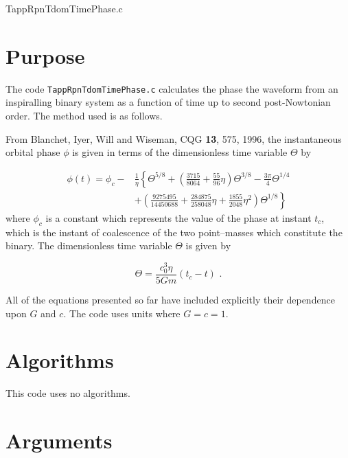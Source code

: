 \documentclass[12pt]{article}
\begin{document}
\huge
\begin{center}
TappRpnTdomTimePhase.c
\end{center}
\normalsize
\vspace{10mm}

\section{Purpose}

The code \texttt{TappRpnTdomTimePhase.c} calculates the phase the waveform from an inspiralling binary system as a function of time up to second post-Nowtonian order. The method used is as follows.

From Blanchet, Iyer, Will and Wiseman, CQG \textbf{13}, 575, 1996, the instantaneous orbital phase $\phi$ is given in terms of the dimensionless time variable $\Theta$  by

\begin{equation}
\begin{split}
\phi(t) = \phi_{c} - &  \frac{1}{\eta} \left\{ \Theta^{5/8} + \left( \frac{3715}{8064} + \frac{55}{96} \eta \right) \Theta^{3/8} - \frac{3 \pi}{4} \Theta^{1/4} \right.  \\
                     &  + \left. \left( \frac{9275495}{14450688} + \frac{284875}{258048} \eta + \frac{1855}{2048} \eta^{2} \right) \Theta^{1/8} \right\}
\end{split}
\label{phioft}
\end{equation} 
where $\phi_{c}$ is a constant which represents the value of the phase at instant $t_{c}$, which is the instant of coalescence of the two point--masses which constitute the binary.
The dimensionless time variable $\Theta$ is given by

\begin{equation}
\Theta = \frac{c^{3}_{0} \eta}{5Gm} (t_{c} - t) \,\,.
\end{equation}

All of the equations presented so far have included explicitly their dependence upon $G$ and $c$. The code uses units where $G=c=1$.


\section{Algorithms}

This code uses no algorithms.


\section{Arguments}
\end{document}
